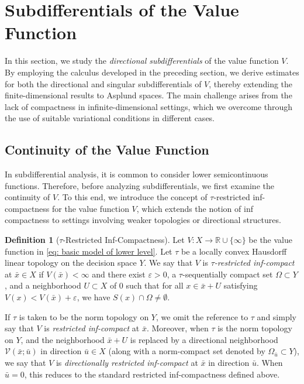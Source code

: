\documentclass[12pt,twoside,reqno]{amsart}
\theoremstyle{definition}
\newtheorem{definition}[theorem]{Definition}
\numberwithin{equation}{section}
\begin{document}
\section{Subdifferentials of the Value Function}

In this section, we study the \emph{directional subdifferentials} of the value function \( V \). 
By employing the calculus developed in the preceding section, we derive estimates for both the directional and singular subdifferentials of \( V \), thereby extending the finite-dimensional results to Asplund spaces. 
The main challenge arises from the lack of compactness in infinite-dimensional settings, which we overcome through the use of suitable variational conditions in different cases. 

\subsection{Continuity of the Value Function}
In subdifferential analysis, it is common to consider lower semicontinuous functions. 
Therefore, before analyzing subdifferentials, we first examine the continuity of \( V \). 
To this end, we introduce the concept of \(\tau\)-restricted inf-compactness for the value function \( V \), which extends the notion of inf compactness to settings involving weaker topologies or directional structures.

\begin{definition}[\(\tau\)-Restricted Inf-Compactness]\label{defn: restricted inf compactness}
Let \( V : X \to \mathbb{R} \cup \{\infty\} \) be the value function in \eqref{eq: basic model of lower level}. 
Let \( \tau \) be a locally convex Hausdorff linear topology on the decision space \( Y \). 
We say that \( V \) is \emph{\(\tau\)-restricted inf-compact} at \( \bar{x} \in X \) if \( V(\bar{x}) < \infty \) and there exist \( \varepsilon > 0 \), a \( \tau \)-sequentially compact set \( \Omega \subset Y \), and a neighborhood \( U \subset X \) of \( 0 \) such that for all \( x \in \bar{x} + U \) satisfying \( V(x) < V(\bar{x}) + \varepsilon \), we have $S(x) \cap \Omega \neq \emptyset$. 

If \( \tau \) is taken to be the norm topology on \( Y \), we omit the reference to \( \tau \) and simply say that \( V \) is \emph{restricted inf-compact} at \( \bar{x} \). 
Moreover, when \( \tau \) is the norm topology on $Y$, and the neighborhood $\bar{x} + U$ is replaced by a directional neighborhood \( \mathcal{V}(\bar{x};\bar{u}) \) in direction $\bar{u} \in X$ (along with a norm-compact set denoted by \( \Omega_{\bar{u}} \subset Y \)), we say that \( V \) is \emph{directionally restricted inf-compact} at $\bar{x}$ in direction \( \bar{u} \). 
When \( \bar{u} = 0 \), this reduces to the standard restricted inf-compactness defined above.
\end{definition}
\end{document}
